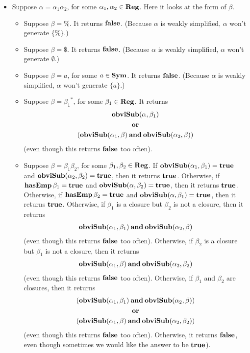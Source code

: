 \begin{itemize}
\item Suppose $\alpha = \alpha_1\alpha_2$, for some $\alpha_1,\alpha_2\in\mathbf{Reg}$.
Here it looks at the form of $\beta$.
\begin{itemize}
\item Suppose $\beta = \%$.  It returns $\mathbf{false}$.  (Because $\alpha$
  is weakly simplified, $\alpha$ won't generate $\{\%\}$.)

\item Suppose $\beta = \$$. It returns $\mathbf{false}$.  (Because $\alpha$ is
  weakly simplified, $\alpha$ won't generate $\emptyset$.)

\item Suppose $\beta = a$, for some $a\in\mathbf{Sym}$. It returns $\mathbf{false}$.
  (Because $\alpha$ is weakly simplified, $\alpha$ won't generate
  $\{a\}$.)

\item Suppose $\beta={\beta_1}^*$, for some $\beta_1\in\mathbf{Reg}$. It returns
\begin{gather*}
\mathbf{obviSub}(\alpha, \beta_1) \\
\mathbin{\mathbf{or}} \\
(\mathbf{obviSub}(\alpha_1, \beta) \mathbin{\mathbf{and}} \mathbf{obviSub}(\alpha_2, \beta))
\end{gather*}
(even though this returns $\mathbf{false}$ too often).

\item Suppose $\beta = \beta_1\beta_2$, for some $\beta_1,\beta_2\in\mathbf{Reg}$.
If $\mathbf{obviSub}(\alpha_1, \beta_1)=\mathbf{true}$ and $\mathbf{obviSub}(\alpha_2,
\beta_2)=\mathbf{true}$, then it returns $\mathbf{true}$.
Otherwise, if $\mathbf{hasEmp}\,\beta_1=\mathbf{true}$ and $\mathbf{obviSub}(\alpha,\beta_2)=\mathbf{true}$,
then it returns $\mathbf{true}$.
Otherwise, if $\mathbf{hasEmp}\,\beta_2=\mathbf{true}$ and $\mathbf{obviSub}(\alpha,\beta_1)=\mathbf{true}$,
then it returns $\mathbf{true}$.
Otherwise, if $\beta_1$ is a closure but $\beta_2$ is not a closure,
then it returns
\begin{gather*}
\mathbf{obviSub}(\alpha_1, \beta_1) \mathbin{\mathbf{and}} \mathbf{obviSub}(\alpha_2, \beta)
\end{gather*}
(even though this returns $\mathbf{false}$ too often).
Otherwise, if $\beta_2$ is a closure but $\beta_1$ is not a closure,
then it returns
\begin{gather*}
\mathbf{obviSub}(\alpha_1, \beta) \mathbin{\mathbf{and}} \mathbf{obviSub}(\alpha_2, \beta_2)
\end{gather*}
(even though this returns $\mathbf{false}$ too often).
Otherwise, if $\beta_1$ and $\beta_2$ are closures, then it
returns
\begin{gather*}
(\mathbf{obviSub}(\alpha_1, \beta_1) \mathbin{\mathbf{and}} \mathbf{obviSub}(\alpha_2, \beta)) \\
\mathbin{\mathbf{or}} \\
(\mathbf{obviSub}(\alpha_1, \beta) \mathbin{\mathbf{and}} \mathbf{obviSub}(\alpha_2, \beta_2))
\end{gather*}
(even though this returns $\mathbf{false}$ too often).
Otherwise, it returns $\mathbf{false}$, even though sometimes we would like
the answer to be $\mathbf{true}$).


\end{itemize}
\end{itemize}
